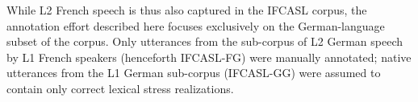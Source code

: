 \documentclass[a4paper]{article}
\newcommand{\TODO}[1]{{\color{red}\textbf{[TODO #1]}}}
\begin{document}
	While L2 French speech is thus also captured in the IFCASL corpus, the annotation effort described here focuses exclusively on the German-language subset of the corpus. Only utterances from the sub-corpus of L2 German speech by L1 French speakers (henceforth IFCASL-FG) were manually annotated; native utterances from the L1 German sub-corpus (IFCASL-GG) were assumed to contain only correct lexical stress realizations.
%	
	
	
		
\end{document}

